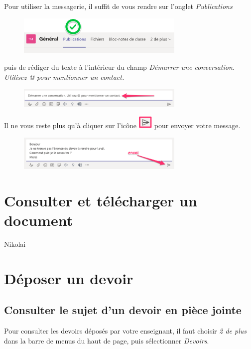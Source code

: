 Pour utiliser la messagerie, il suffit de vous rendre sur l'onglet \textit{Publications}

\begin{figure}[h]
\includegraphics[width=8cm]{./images/teams/publications}
\centering
\end{figure}

puis de rédiger du texte à l'intérieur du champ \textit{Démarrer une conversation. Utilisez @ pour mentionner un contact.}

\begin{figure}[h]
\includegraphics[width=8cm]{./images/teams/publications2}
\centering
\end{figure}

Il ne vous reste plus qu'à cliquer sur l'icône \includegraphics[width=0.7cm]{./images/teams/envoi_message} pour envoyer votre message.

\begin{figure}[h]
\includegraphics[width=8cm]{./images/teams/publications3}
\centering
\end{figure}





\section{Consulter et télécharger un document}

Nikolai

\section{Déposer un devoir}

\subsection{Consulter le sujet d'un devoir en pièce jointe}
Pour consulter les devoirs déposés par votre enseignant, il faut choisir \textit{2 de plus} dans la barre de menus du haut de page, puis sélectionner \textit{Devoirs}.\\

